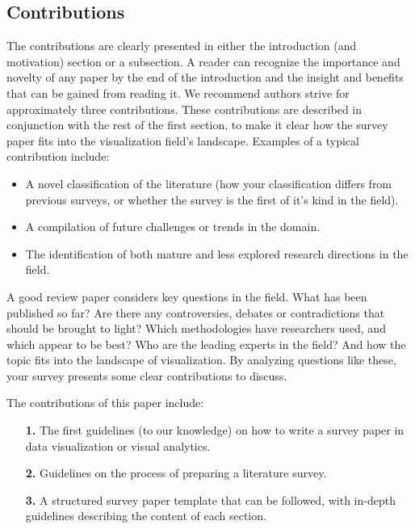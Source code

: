 \subsection{Contributions}
The contributions are clearly presented in either the introduction (and motivation) section or a subsection. A reader can recognize the importance and novelty of any paper by the end of the introduction and the insight and benefits that can be gained from reading it. We recommend authors strive for approximately three contributions. These contributions are described in conjunction with the rest of the first section, to make it clear how the survey paper fits into the visualization field's landscape. Examples of a typical contribution include: 
\begin{itemize}
\item A novel classification of the literature (how your classification differs from previous surveys, or whether the survey is the first of it's kind in the field).
\item A compilation of future challenges or trends in the domain.
\item The identification of both mature and less explored research directions in the field.
\end{itemize}


A good review paper considers key questions in the field. What has been published so far? Are there any controversies, debates or contradictions that should be brought to light? Which methodologies have researchers used, and which appear to be best? Who are the leading experts in the field? And how the topic fits into the landscape of visualization. By analyzing questions like these, your survey presents some clear contributions to discuss.

The contributions of this paper include: 

\begin{itemize}[labelindent=0em, labelsep=0.2cm, leftmargin=*]
\item[\textbf{1.}] The first guidelines (to our knowledge) on how to write a survey paper in data visualization or visual analytics.
\item[\textbf{2.}] Guidelines on the process of preparing a literature survey.
\item[\textbf{3.}] A structured survey paper template that can be followed, with in-depth guidelines describing the content of each section.
\end{itemize}


